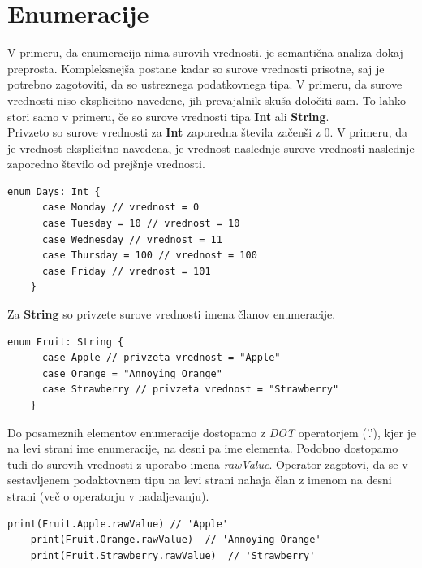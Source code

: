\documentclass[a4paper, 12p]{book}
\begin{document}
\section{Enumeracije}

V primeru, da enumeracija nima surovih vrednosti, je semantična analiza dokaj preprosta. Kompleksnejša postane kadar so surove vrednosti prisotne, saj je potrebno zagotoviti, da so ustreznega podatkovnega tipa. V primeru, da surove vrednosti niso eksplicitno navedene, jih prevajalnik skuša določiti sam. To lahko stori samo v primeru, če so surove vrednosti tipa \textbf{Int} ali \textbf{String}. \\
\indent Privzeto so surove vrednosti za \textbf{Int} zaporedna števila začenši z 0. V primeru, da je vrednost eksplicitno navedena, je vrednost naslednje surove vrednosti naslednje zaporedno število od prejšnje vrednosti.

\begin{lstlisting}[caption={Enumeracija s surovimi vrednostmi tipa Int}, captionpos=b]
	enum Days: Int {
	  case Monday // vrednost = 0
	  case Tuesday = 10 // vrednost = 10
	  case Wednesday // vrednost = 11
	  case Thursday = 100 // vrednost = 100
	  case Friday // vrednost = 101
	}
\end{lstlisting}

\indent Za \textbf{String} so privzete surove vrednosti imena članov enumeracije.

\begin{lstlisting}[caption={Enumeracija s surovimi vrednostmi tipa String}, captionpos=b, label={lst:fruitEnumeration}]
	enum Fruit: String {
	  case Apple // privzeta vrednost = "Apple"
	  case Orange = "Annoying Orange"
	  case Strawberry // privzeta vrednost = "Strawberry"
	}
\end{lstlisting}

Do posameznih elementov enumeracije dostopamo z \textit{DOT} operatorjem ('.'), kjer je na levi strani ime enumeracije, na desni pa ime elementa. Podobno dostopamo tudi do surovih vrednosti z uporabo imena \textit{rawValue}. Operator zagotovi, da se v sestavljenem podaktovnem tipu na levi strani nahaja član z imenom na desni strani (več o operatorju v nadaljevanju).

\begin{lstlisting}[caption={Primer dostopa do elementov enumeracije ~\ref{lst:fruitEnumeration}}, captionpos=b]
	print(Fruit.Apple.rawValue) // 'Apple'
	print(Fruit.Orange.rawValue)  // 'Annoying Orange'
	print(Fruit.Strawberry.rawValue)  // 'Strawberry'
\end{lstlisting}
\end{document}
